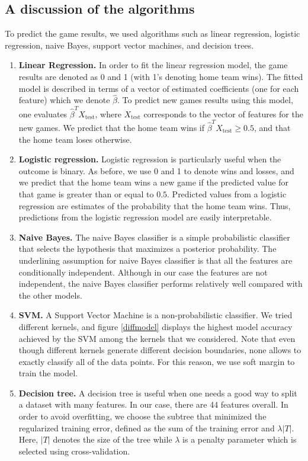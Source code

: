 \documentclass{article} %
\begin{document}
	
	\subsection{A discussion of the algorithms}
	To predict the game results, we used algorithms such as linear regression, logistic regression, naive Bayes, support vector machines, and decision trees.
	\begin{enumerate}
	\item \textbf{Linear Regression.}
          In order to fit the linear regression model, the game results are denoted as 0 and 1 (with 1's denoting home team wins). The fitted model is described in terms of a vector  of estimated coefficients (one for each feature) which we denote $\hat \beta$. To predict new games results using this model, one evaluates $\hat \beta^{T} X_{\text{test}}$, where $X_{\text{test}}$ corresponds to the vector of features for the new games. We predict that the home team wins if $\hat \beta^{T} X_{\text{test}} \ge 0.5$, and that the home team loses otherwise.
	\item \textbf{Logistic regression.} Logistic regression is particularly useful when the outcome is binary. As before, we use 0 and 1 to denote wins and losses, and we predict that the home team wins a new game if the predicted value for that game is greater than or equal to $0.5$. Predicted values from a logistic regression are estimates of the probability that the home team wins. Thus, predictions from the logistic regression model are easily interpretable.
	\item \textbf{Naive Bayes.} The naive Bayes classifier is a simple probabilistic classifier that selects the hypothesis that maximizes a posterior probability. The underlining assumption for naive Bayes classifier is that all the features are conditionally independent. Although in our case the features are not independent, the naive Bayes classifier performs relatively well compared with the other models. 
	\item \textbf{SVM.}  A Support Vector Machine is a non-probabilistic classifier. We tried different kernels, and figure \ref{diffmodel} displays the highest model accuracy achieved by the SVM among the kernels that we considered. Note that even though different kernels generate different decision boundaries, none allows to exactly classify all of the data points. For this reason, we use soft margin to train the model.
	\item \textbf{Decision tree.} A decision tree is useful when one needs a good way to split a dataset with many features. In our case, there are 44 features overall. In order to avoid overfitting, we choose the subtree that minimized the regularized training error, defined as the sum of the training error and $\lambda |T|$. Here, $|T|$ denotes the size	of the tree while $\lambda$ is a penalty parameter which is selected using cross-validation.
	\end{enumerate}
\end{document}
